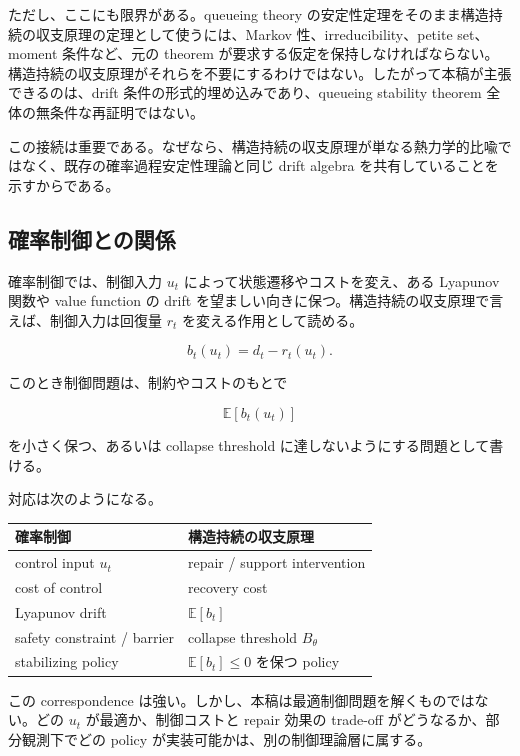 \documentclass[12pt,a4paper]{article}
\begin{document}
ただし、ここにも限界がある。queueing theory の安定性定理をそのまま構造持続の収支原理の定理として使うには、Markov 性、irreducibility、petite set、moment 条件など、元の theorem が要求する仮定を保持しなければならない。構造持続の収支原理がそれらを不要にするわけではない。したがって本稿が主張できるのは、drift 条件の形式的埋め込みであり、queueing stability theorem 全体の無条件な再証明ではない。

この接続は重要である。なぜなら、構造持続の収支原理が単なる熱力学的比喩ではなく、既存の確率過程安定性理論と同じ drift algebra を共有していることを示すからである。

\subsection{確率制御との関係}\label{ux78baux7387ux5236ux5fa1ux3068ux306eux95a2ux4fc2}

確率制御では、制御入力 \(u_{t}\) によって状態遷移やコストを変え、ある Lyapunov 関数や value function の drift を望ましい向きに保つ。構造持続の収支原理で言えば、制御入力は回復量 \(r_{t}\) を変える作用として読める。

\[
b_{t}(u_{t})=d_{t}-r_{t}(u_{t}).
\]

このとき制御問題は、制約やコストのもとで

\[
\mathbb E[b_{t}(u_{t})]
\]

を小さく保つ、あるいは collapse threshold に達しないようにする問題として書ける。

対応は次のようになる。

{\def\LTcaptype{table} %
\begin{longtable}[]{@{}ll@{}}
\toprule\noalign{}
確率制御 & 構造持続の収支原理 \\
\midrule\noalign{}
\endhead
\bottomrule\noalign{}
\endlastfoot
control input \(u_t\) & repair / support intervention \\
cost of control & recovery cost \\
Lyapunov drift & \(\mathbb E[b_t]\) \\
safety constraint / barrier & collapse threshold \(B_\theta\) \\
stabilizing policy & \(\mathbb E[b_t]\le 0\) を保つ policy \\
\end{longtable}
}

この correspondence は強い。しかし、本稿は最適制御問題を解くものではない。どの \(u_{t}\) が最適か、制御コストと repair 効果の trade-off がどうなるか、部分観測下でどの policy が実装可能かは、別の制御理論層に属する。
\end{document}
